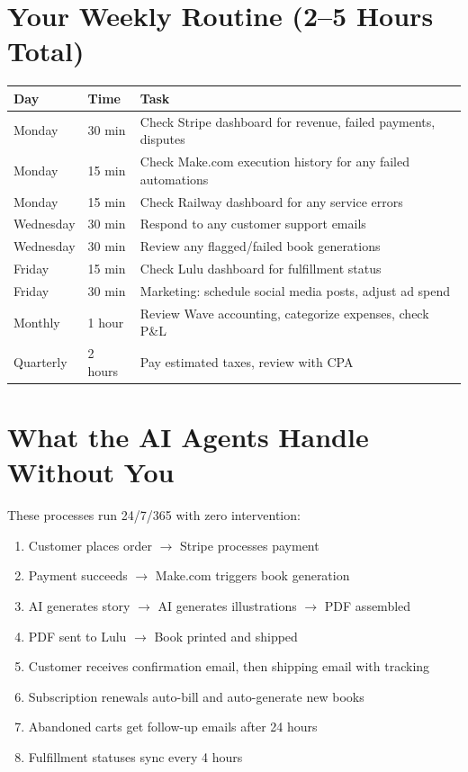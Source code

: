 \documentclass[12pt, letterpaper, oneside]{book}
\begin{document}
\section{Your Weekly Routine (2--5 Hours Total)}

\begin{table}[H]
\centering
\begin{tabularx}{\textwidth}{llX}
\toprule
\textbf{Day} & \textbf{Time} & \textbf{Task} \\
\midrule
Monday & 30 min & Check Stripe dashboard for revenue, failed payments, disputes \\
Monday & 15 min & Check Make.com execution history for any failed automations \\
Monday & 15 min & Check Railway dashboard for any service errors \\
Wednesday & 30 min & Respond to any customer support emails \\
Wednesday & 30 min & Review any flagged/failed book generations \\
Friday & 15 min & Check Lulu dashboard for fulfillment status \\
Friday & 30 min & Marketing: schedule social media posts, adjust ad spend \\
Monthly & 1 hour & Review Wave accounting, categorize expenses, check P\&L \\
Quarterly & 2 hours & Pay estimated taxes, review with CPA \\
\bottomrule
\end{tabularx}
\end{table}

\section{What the AI Agents Handle Without You}

These processes run 24/7/365 with zero intervention:

\begin{enumerate}[leftmargin=2em, itemsep=2pt]
  \item Customer places order $\rightarrow$ Stripe processes payment
  \item Payment succeeds $\rightarrow$ Make.com triggers book generation
  \item AI generates story $\rightarrow$ AI generates illustrations $\rightarrow$ PDF assembled
  \item PDF sent to Lulu $\rightarrow$ Book printed and shipped
  \item Customer receives confirmation email, then shipping email with tracking
  \item Subscription renewals auto-bill and auto-generate new books
  \item Abandoned carts get follow-up emails after 24 hours
  \item Fulfillment statuses sync every 4 hours
\end{enumerate}
\end{document}
